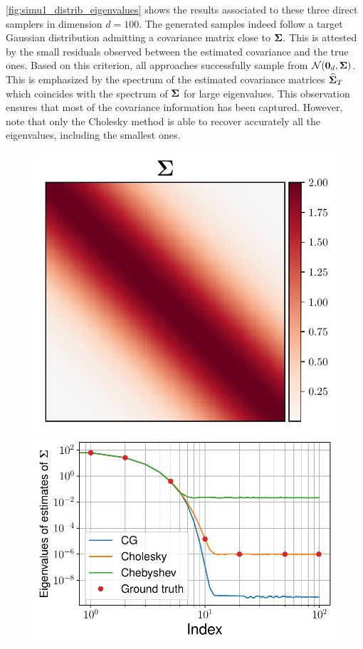 \documentclass[nohypdvips,onefignum,onetabnum]{siamart171218}
\begin{document}
\cref{fig:simu1_distrib_eigenvalues} shows the results associated to these three direct samplers in dimension $d=100$.
The generated samples indeed follow a target Gaussian distribution admitting a covariance matrix close to $\mathbf{\Sigma}$. 
This is attested by the small residuals observed between the estimated covariance and the true ones. Based on this criterion, all approaches successfully sample from $\mathcal{N}(\mathbf{0}_d,\mathbf{\Sigma})$.
This is emphasized by the spectrum of the estimated covariance matrices $\mathbf{\widehat{\Sigma}}_T$ which coincides with the spectrum of $\mathbf{\Sigma}$ for large eigenvalues. This observation ensures that most of the covariance information has been captured. However, note that only the Cholesky method is able to recover accurately all the eigenvalues, including the smallest ones.
%
\begin{figure}
  \centering
  \mbox{{\includegraphics[scale=0.45]{images/simu1_ex1_A.pdf}}}
  \mbox{{\includegraphics[scale=0.4]{images/simu1_ex1_eigvals.pdf}}}

\end{figure}
\end{document}

